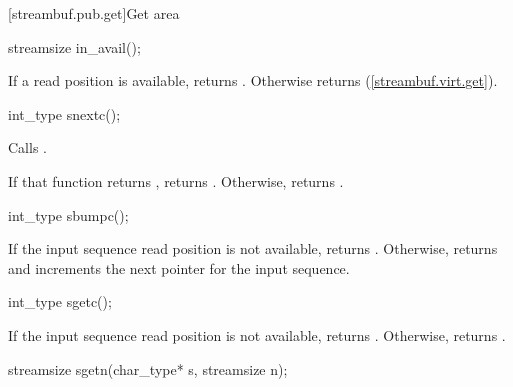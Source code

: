 [streambuf.pub.get]{Get area}

%
\begin{itemdecl}
streamsize in_avail();
\end{itemdecl}

\begin{itemdescr}
\pnum
\returns
If a read position is available, returns
.
Otherwise returns
 (\ref{streambuf.virt.get}).
\end{itemdescr}

%
\begin{itemdecl}
int_type snextc();
\end{itemdecl}

\begin{itemdescr}
\pnum
\effects
Calls
.

\pnum
\returns
If that function returns
,
returns
.
Otherwise, returns
.
\end{itemdescr}

%
\begin{itemdecl}
int_type sbumpc();
\end{itemdecl}

\begin{itemdescr}
\pnum
\returns
If the input sequence read position is not available,
returns
.
Otherwise, returns
and increments the next pointer for the input sequence.
\end{itemdescr}

%
\begin{itemdecl}
int_type sgetc();
\end{itemdecl}

\begin{itemdescr}
\pnum
\returns
If the input sequence read position is not available,
returns
.
Otherwise, returns
.
\end{itemdescr}

%
\begin{itemdecl}
streamsize sgetn(char_type* s, streamsize n);
\end{itemdecl}

